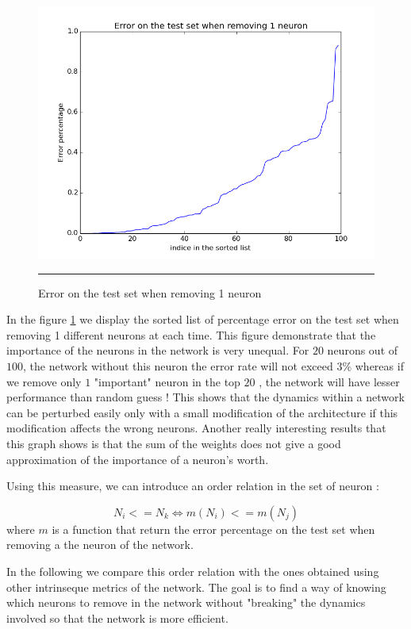 \begin{figure}[htbp]
    \centering
    \includegraphics[scale=0.8]{Figures/error_test_set_remove_neuron.png}
    \rule{35em}{0.5pt}
    \caption[Error on the test set when removing 1 neuron]{Error on the test set when removing 1 neuron}
    \label{fig:error_one_neuron}
\end{figure}

In the figure \ref{fig:error_one_neuron} we display the sorted list of percentage error on the test set when removing 1 different neurons at each time. This figure demonstrate that the importance of the neurons in the network is very unequal. For $20$ neurons out of $100$, the network without this neuron the error rate will not exceed $3\%$ whereas if we remove only $1$ "important" neuron in the top $20$ , the network will have lesser performance than random guess ! This shows that the dynamics within a network can be perturbed easily only with a small modification of the architecture if this modification affects the wrong neurons. Another really interesting results that this graph shows is that the sum of the weights does not give a good approximation of the importance of a neuron's worth.

Using this measure, we can introduce an order relation in the set of neuron : 

$$ N_i <= N_k \Leftrightarrow m(N_i) <= m(N_j) $$ where $m$ is a function that return the error percentage on the test set when removing a the neuron of the network.

In the following we compare this order relation with the ones obtained using other intrinseque metrics of the network. The goal is to find a way of knowing which neurons to remove in the network without "breaking" the dynamics involved so that the network is more efficient. 







